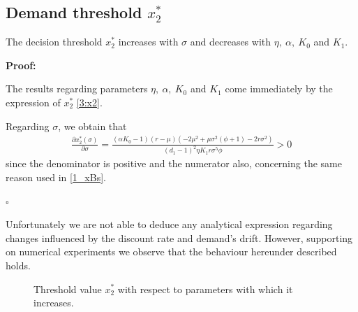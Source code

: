 \subsection{Demand threshold $x_2^*$}
	\label{3_dmx2}
	
\begin{prop}
	\label{3_propx2}
	The decision threshold $x_2^*$ increases with $\sigma$ and decreases with $\eta, \ \alpha, \ K_0$ and $K_1$.
\end{prop}

\textbf{Proof:}

The results regarding parameters $\eta, \ \alpha, \ K_0$ and $K_1$ come immediately by the expression of $x_2^*$  \eqref{3:x2}.

Regarding $\sigma$, we obtain that
\begin{align*}
\frac{\partial x_2^* ( \sigma) }{\partial \sigma}=
\frac{(\alpha  K_0-1) (r-\mu) \left(-2 \mu ^2+\mu  \sigma ^2 \left(\phi+1\right)-2 r \sigma ^2\right)}{(d_1-1)^2 \eta  K_1 r \sigma ^5 \phi}>0
\end{align*}
since the denominator is positive and the numerator also, concerning the same reason used in \eqref{1_xBs}.

\begin{flushright}
	$\square$
\end{flushright}


Unfortunately we are not able to deduce any analytical expression regarding changes influenced by the discount rate and demand's drift. However, supporting on numerical experiments we observe that the behaviour hereunder described holds.

\begin{figure}[!htb]
	\begin{subfigmatrix}{1}
	\end{subfigmatrix}
	\caption{Threshold value $x^*_2$ with respect to parameters with which it increases.}
	\label{fig:2_x2i}
\end{figure}

